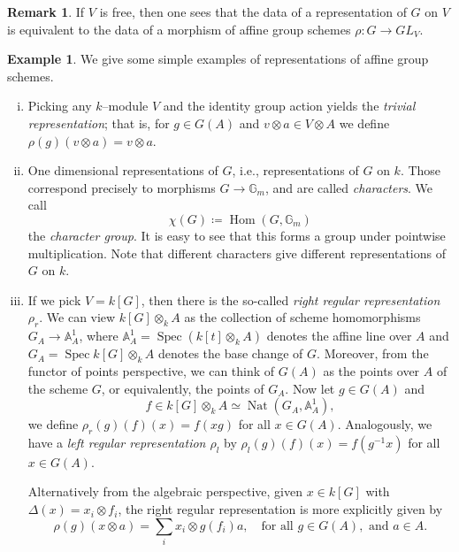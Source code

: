 \documentclass{article}
\theoremstyle{plain}
\theoremstyle{definition}
\newtheorem{Rem}[Th]{Remark}
\newtheorem{Ex}[Th]{Example}
\DeclareMathOperator{\Hom}{Hom}
\DeclareMathOperator{\Nat}{Nat}
\DeclareMathOperator{\Spec}{Spec}
\begin{document}
\begin{Rem}
     If $V$ is free, then one sees that the data of a representation of $G$ on $V$ is equivalent to the data of a morphism of affine group schemes $\rho\colon  G\to GL_V$.
\end{Rem}

\begin{Ex}\label{examples 2} We give some simple examples of representations of affine group schemes.
\begin{enumerate}[(i)]
    \item Picking any $k$--module $V$ and the identity group action yields the \textit{trivial representation}; that is, for $g\in G(A)$ and $v\otimes a \in  V\otimes A$ we define $\rho(g)(v\otimes a)=v\otimes a$.
    \item One dimensional representations of $G$, i.e., representations of $G$ on $k$. Those correspond precisely to morphisms $G\to \mathbb{G}_m$, and are called \textit{characters}. We call 
    \[
    \chi(G)\coloneqq\Hom(G, \mathbb{G}_m)
    \]
    the \textit{character group}. It is easy to see that this forms a group under pointwise multiplication. Note that different characters give different representations of $G$ on $k$.
    \item If we pick $V=k[G]$, then there is the so-called \textit{right  regular representation $\rho_r$}. We can view $k[G]\otimes_k A$ as the collection of scheme homomorphisms $G_A\to \mathbb{A}^1_A$, where $\mathbb{A}^1_A=\Spec( k[t]\otimes_k A) $ denotes the affine line over $A$ and $G_A=\Spec k[G]\otimes_k A$ denotes the base change of $G$. Moreover, from the functor of points perspective, we can think of $G(A)$ as the points over $A$ of the scheme $G$, or equivalently, the points of $G_A$. Now let $g\in G(A)$ and 
    \[
    f\in k[G]\otimes_k A \simeq \Nat(G_A, \mathbb{A}^1_A),
    \]
    we define $\rho_r(g)(f)(x)=f(xg)$ for all $x\in G(A)$. Analogously, we have a \textit{left regular representation $\rho_l$} by $\rho_l(g)(f)(x)=f(g^{-1}x)$ for all $x\in G(A)$. 

    Alternatively from the algebraic perspective, given $x\in k[G]$ with $\Delta(x)=x_i\otimes f_i$, the right regular representation is more explicitly given by 
    \[
    \rho(g)(x\otimes a)=\sum_i x_i\otimes g(f_i)a, \quad \mbox{for all }  g\in G(A), \mbox{ and } a\in A.
    \]
\end{enumerate}
\end{Ex}
\end{document}
